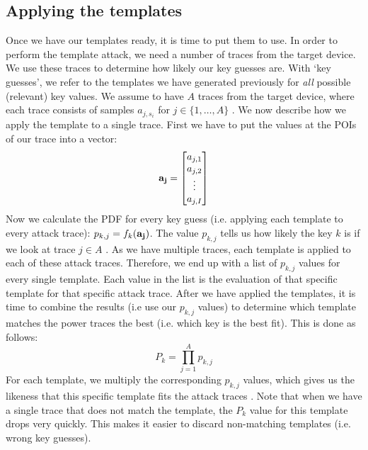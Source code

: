 \subsection{Applying the templates}
Once we have our templates ready, it is time to put them to use.
In order to perform the template attack, we need a number of traces from the target device.
We use these traces to determine how likely our key guesses are.
With `key guesses', we refer to the templates we have generated previously for \emph{all} possible (relevant) key values.
We assume to have $A$ traces from the target device, where each trace consists of samples $a_{j, s_i}$ for $j \in \{1, \ldots , A \}$ \cite{whisperer2018template}.
We now describe how we apply the template to a single trace.
First we have to put the values at the POIs of our trace into a vector:
%
\begin{equation*}
\operatorname{\textbf{a\textsubscript{j}}} =
%
\begin{bmatrix}
a_{j, 1} \\
a_{j, 2} \\
\vdots \\
a_{j, I}
\end{bmatrix}
%
\end{equation*}
%
Now we calculate the PDF for every key guess (i.e. applying each template to every attack trace): $p_{k, j} = f_k(\operatorname{\textbf{a\textsubscript{j}}})$. 
The value $p_{k, j}$ tells us how likely the key $k$ is if we look at trace $j \in A$ \cite{whisperer2018template}. 
As we have multiple traces, each template is applied to each of these attack traces.
Therefore, we end up with a list of $p_{k, j}$ values for every single template. 
Each value in the list is the evaluation of that specific template for that specific attack trace.
After we have applied the templates, it is time to combine the results (i.e use our $p_{k, j}$ values) to determine which template matches the power traces the best (i.e. which key is the best fit).
This is done as follows:
%
\begin{equation*}
P_k = \prod_{j = 1}^{A} p_{k, j}
\end{equation*}
%
For each template, we multiply the corresponding $p_{k, j}$ values, which gives us the likeness that this specific template fits the attack traces \cite{whisperer2018template}. 
Note that when we have a single trace that does not match the template, the $P_k$ value for this template drops very quickly.
This makes it easier to discard non-matching templates (i.e. wrong key guesses).
%
